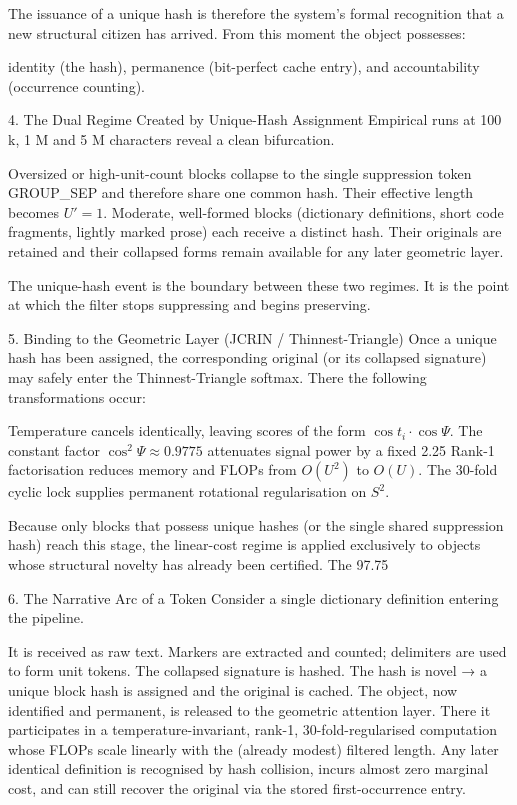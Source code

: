 The issuance of a unique hash is therefore the system’s formal recognition that a new structural citizen has arrived. From this moment the object possesses:

identity (the hash),  
permanence (bit-perfect cache entry),  
and accountability (occurrence counting).

4. The Dual Regime Created by Unique-Hash Assignment
Empirical runs at 100 k, 1 M and 5 M characters reveal a clean bifurcation.

Oversized or high-unit-count blocks collapse to the single suppression token GROUP_SEP and therefore share one common hash. Their effective length becomes \(U'=1\).  
Moderate, well-formed blocks (dictionary definitions, short code fragments, lightly marked prose) each receive a distinct hash. Their originals are retained and their collapsed forms remain available for any later geometric layer.

The unique-hash event is the boundary between these two regimes. It is the point at which the filter stops suppressing and begins preserving.

5. Binding to the Geometric Layer (JCRIN / Thinnest-Triangle)
Once a unique hash has been assigned, the corresponding original (or its collapsed signature) may safely enter the Thinnest-Triangle softmax. There the following transformations occur:

Temperature cancels identically, leaving scores of the form \(\cos t_i\cdot\cos\Psi\).  
The constant factor \(\cos^2\Psi\approx0.9775\) attenuates signal power by a fixed 2.25 %
Rank-1 factorisation reduces memory and FLOPs from \(O(U^2)\) to \(O(U)\).  
The 30-fold cyclic lock supplies permanent rotational regularisation on \(S^2\).

Because only blocks that possess unique hashes (or the single shared suppression hash) reach this stage, the linear-cost regime is applied exclusively to objects whose structural novelty has already been certified. The 97.75 %

6. The Narrative Arc of a Token
Consider a single dictionary definition entering the pipeline.

It is received as raw text.  
Markers are extracted and counted; delimiters are used to form unit tokens.  
The collapsed signature is hashed.  
The hash is novel → a unique block hash is assigned and the original is cached.  
The object, now identified and permanent, is released to the geometric attention layer.  
There it participates in a temperature-invariant, rank-1, 30-fold-regularised computation whose FLOPs scale linearly with the (already modest) filtered length.  
Any later identical definition is recognised by hash collision, incurs almost zero marginal cost, and can still recover the original via the stored first-occurrence entry.

